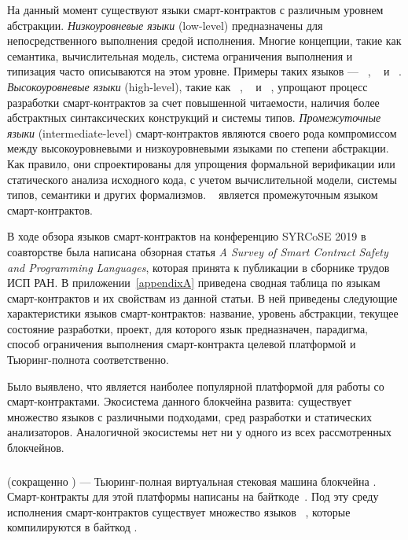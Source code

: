 На данный момент существуют языки смарт-контрактов с различным уровнем абстракции. 
\emph{Низкоуровневые языки} (low-level) предназначены для непосредственного выполнения средой исполнения.
Многие концепции, такие как семантика, вычислительная модель, система ограничения выполнения и типизация часто описываются на этом уровне.
Примеры таких языков --- ~\cite{EthereumYellowPaper}, ~\cite{BitcoinScript} и ~\cite{Michelson}.
\emph{Высокоуровневые языки} (high-level), такие как ~\cite{Solidity}, ~\cite{Flint} и ~\cite{liquidity},
упрощают процесс разработки смарт-контрактов за счет повышенной читаемости, наличия более абстрактных синтаксических конструкций и системы типов.
\emph{Промежуточные языки} (intermediate-level) смарт-контрактов являются своего рода компромиссом между высокоуровневыми и низкоуровневыми языками по степени абстракции.
Как правило, они спроектированы для упрощения формальной верификации или статического анализа исходного кода, с учетом вычислительной модели, системы типов, семантики и других формализмов.
~\cite{Scilla} является промежуточным языком смарт-контрактов.

В ходе обзора языков смарт-контрактов на конференцию SYRCoSE 2019 в соавторстве была написана
обзорная статья \emph{A Survey of Smart Contract Safety and Pro\-gram\-ming Languages}, которая принята к публикации в сборнике трудов ИСП РАН.
В приложении~\ref{appendixA} приведена сводная таблица по языкам смарт-кон\-трак\-тов и их свойствам из данной статьи.
В ней приведены следующие характеристики языков смарт-контрактов: название, уровень абстракции, текущее состояние разработки, проект, для которого язык предназначен, парадигма, способ ограничения выполнения смарт-контракта целевой платформой и Тьюринг-полнота соответственно.

Было выявлено, что  является наиболее популярной платформой для работы со смарт-контрактами.
Экосистема данного блокчейна развита: существует множество языков с различными подходами, сред разработки и статических анализаторов.
Аналогичной экосистемы нет ни у одного из всех рассмотренных блокчейнов.


\subsubsection{}
 (сокращенно ) --- Тьюринг-полная виртуальная стековая машина блокчейна .
Смарт-контракты для этой платформы написаны на байткоде~\cite{EthereumYellowPaper}.
Под эту среду исполнения смарт-контрактов существует множество языков ~\cite{Bamboo, Flint, IELE, Logikon, Solidity, SolidityX, Vyper, LLL, Yul}, которые компилируются в байткод .

